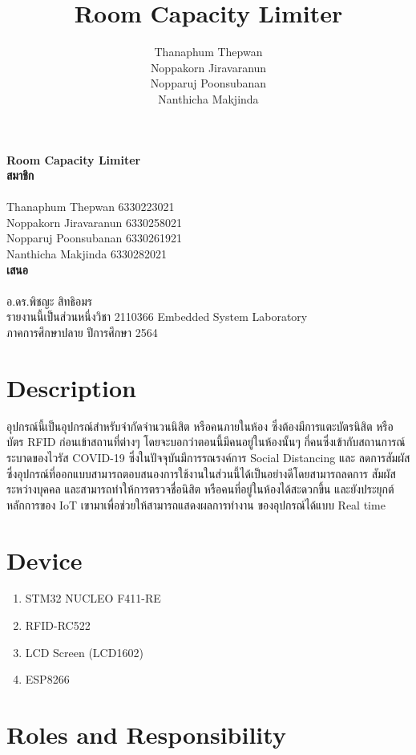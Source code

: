 \documentclass[fontsize=14pt]{extarticle}
\date{}
\title{\huge\textbf{Room Capacity Limiter}}
\author{Thanaphum Thepwan\\ Noppakorn Jiravaranun\\ Nopparuj Poonsubanan\\ Nanthicha Makjinda}
\begin{document}
\begin{center}
    \textbf{\Huge Room Capacity Limiter\\}
    \vspace*{\fill}
    {
        \LARGE
        \textbf{สมาชิก}\\~\\
        Thanaphum Thepwan 6330223021\\
        Noppakorn Jiravaranun 6330258021\\
        Nopparuj Poonsubanan 6330261921\\
        Nanthicha Makjinda 6330282021\\
        \vspace*{\fill}
        \textbf{เสนอ}\\~\\
        อ.ดร.พิชญะ สิทธิอมร\\
        \vspace*{\fill}
        รายงานนี้เป็นส่วนหนึ่งวิชา 2110366 Embedded System Laboratory\\
        ภาคการศึกษาปลาย ปีการศึกษา 2564
    }
\end{center}
\pagebreak
\tableofcontents
\pagebreak
\section{Description}
อุปกรณ์นี้เป็นอุปกรณ์สำหรับจำกัดจำนวนนิสิต หรือคนภายในห้อง ซึ่งต้องมีการแตะบัตรนิสิต หรือบัตร RFID ก่อนเข้าสถานที่ต่างๆ 
โดยจะบอกว่าตอนนี้มีคนอยู่ในห้องนั้นๆ กี่คนซึ่งเข้ากับสถานการณ์ระบาดของไวรัส COVID-19 
ซึ่งในปัจจุบันมีการรณรงค์การ Social Distancing และ ลดการสัมผัสซึ่งอุปกรณ์ที่ออกแบบสามารถตอบสนองการใช้งานในส่วนนี้ได้เป็นอย่างดีโดยสามารถลดการ 
สัมผัสระหว่างบุคคล และสามารถทำให้การตรวจชื่อนิสิต หรือคนที่อยู่ในห้องได้สะดวกขึ้น และยังประยุกต์หลักการของ IoT 
เขามาเพื่อช่วยให้สามารถแสดงผลการทํางาน ของอุปกรณ์ได้แบบ Real time
\section{Device}
\begin{enumerate}
    \item STM32 NUCLEO F411-RE
    \item RFID-RC522
    \item LCD Screen (LCD1602)
    \item ESP8266
\end{enumerate}

\pagebreak
\section{Roles and Responsibility}
\end{document}
